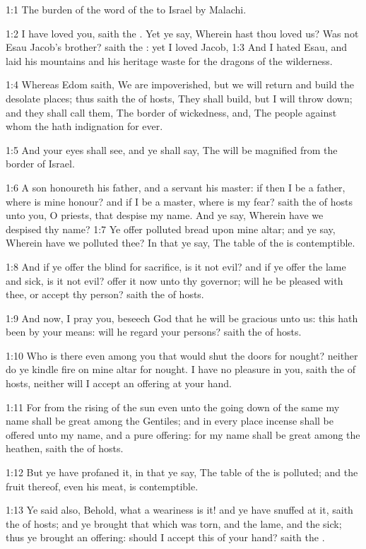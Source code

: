 

1:1 The burden of the word of the \LORD to Israel by Malachi.

1:2 I have loved you, saith the \LORD. Yet ye say, Wherein hast thou
loved us? Was not Esau Jacob's brother? saith the \LORD: yet I loved
Jacob, 1:3 And I hated Esau, and laid his mountains and his heritage
waste for the dragons of the wilderness.

1:4 Whereas Edom saith, We are impoverished, but we will return and
build the desolate places; thus saith the \LORD of hosts, They shall
build, but I will throw down; and they shall call them, The border of
wickedness, and, The people against whom the \LORD hath indignation for
ever.

1:5 And your eyes shall see, and ye shall say, The \LORD will be
magnified from the border of Israel.

1:6 A son honoureth his father, and a servant his master: if then I be
a father, where is mine honour? and if I be a master, where is my
fear? saith the \LORD of hosts unto you, O priests, that despise my
name. And ye say, Wherein have we despised thy name?  1:7 Ye offer
polluted bread upon mine altar; and ye say, Wherein have we polluted
thee? In that ye say, The table of the \LORD is contemptible.

1:8 And if ye offer the blind for sacrifice, is it not evil? and if ye
offer the lame and sick, is it not evil? offer it now unto thy
governor; will he be pleased with thee, or accept thy person? saith
the \LORD of hosts.

1:9 And now, I pray you, beseech God that he will be gracious unto us:
this hath been by your means: will he regard your persons? saith the
\LORD of hosts.

1:10 Who is there even among you that would shut the doors for nought?
neither do ye kindle fire on mine altar for nought. I have no pleasure
in you, saith the \LORD of hosts, neither will I accept an offering at
your hand.

1:11 For from the rising of the sun even unto the going down of the
same my name shall be great among the Gentiles; and in every place
incense shall be offered unto my name, and a pure offering: for my
name shall be great among the heathen, saith the \LORD of hosts.

1:12 But ye have profaned it, in that ye say, The table of the \LORD is
polluted; and the fruit thereof, even his meat, is contemptible.

1:13 Ye said also, Behold, what a weariness is it! and ye have snuffed
at it, saith the \LORD of hosts; and ye brought that which was torn,
and the lame, and the sick; thus ye brought an offering: should I
accept this of your hand? saith the \LORD.

